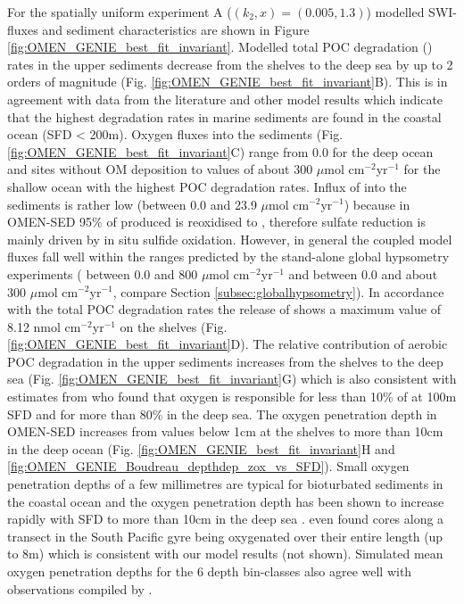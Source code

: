 \documentclass[gmd, manuscript]{copernicus}
\begin{document}
For the spatially uniform experiment A ($(k_2, x) = (0.005, 1.3)$) modelled SWI-fluxes and sediment characteristics are shown in Figure \ref{fig:OMEN_GENIE_best_fit_invariant}.
Modelled total POC degradation () rates in the upper sediments decrease from the shelves to the deep sea by up to 2 orders of magnitude (Fig. \ref{fig:OMEN_GENIE_best_fit_invariant}B). 
This is in agreement with data from the literature \citep[e.g.][]{middelburg_organic_1993, middelburg_empirical_1997} and other model results 
\citep[e.g.][]{thullner_global_scale_2009} which indicate that the highest degradation rates in marine sediments are found in the coastal ocean (SFD < 200m). 
Oxygen fluxes into the sediments (Fig. \ref{fig:OMEN_GENIE_best_fit_invariant}C) range from 0.0 for the deep ocean and sites without OM deposition to values of about 300 $\mu$mol cm$^{-2}$yr$^{-1}$ for the shallow ocean with the highest POC degradation rates. 
Influx of   into the sediments is rather low (between 0.0 and 23.9 $\mu$mol cm$^{-2}$yr$^{-1}$) because in OMEN-SED 95\% of produced  is reoxidised to , therefore sulfate reduction is mainly driven by in situ sulfide oxidation. 
However, in general the coupled model fluxes fall well within the ranges predicted by the stand-alone global hypsometry experiments ( between 0.0 and 800 $\mu$mol cm$^{-2}$yr$^{-1}$ and  between 0.0 and about 300 $\mu$mol cm$^{-2}$yr$^{-1}$, 
compare Section \ref{subsec:globalhypsometry}). 
In accordance with the total POC degradation rates the release of  shows a maximum value of 8.12 nmol cm$^{-2}$yr$^{-1}$ on the shelves (Fig. \ref{fig:OMEN_GENIE_best_fit_invariant}D). 
The relative contribution of aerobic POC degradation in the upper sediments increases from the shelves to the deep sea (Fig. \ref{fig:OMEN_GENIE_best_fit_invariant}G) 
which is also consistent with estimates from %
\citet{thullner_global_scale_2009} who found that oxygen is responsible for less than 10\% of  at 100m SFD and for more 
than 80\% in the deep sea. 
The oxygen penetration depth in OMEN-SED increases from values below 1cm at the shelves to more than 10cm in the deep ocean (Fig. \ref{fig:OMEN_GENIE_best_fit_invariant}H 
and \ref{fig:OMEN_GENIE_Boudreau_depthdep_zox_vs_SFD}).
Small oxygen penetration depths of a few millimetres are typical for bioturbated sediments in the coastal ocean \citep[e.g.][]{wenzhofer_benthic_2002} and 
the oxygen penetration depth has been shown to increase rapidly with SFD to more than 10cm in the deep sea \citep{meile_global_2003, glud_oxygen_2008}. 
\citet{fischer_oxygen_2009} even found cores along a transect in the South Pacific gyre being oxygenated over their entire length (up to 8m) which is consistent 
with our model results (not shown). Simulated mean oxygen penetration depths for the 6 depth bin-classes also agree well with observations compiled by 
\citet[][Fig. \ref{fig:OMEN_GENIE_Boudreau_depthdep_zox_vs_SFD}]{meile_global_2003}.
\end{document}
